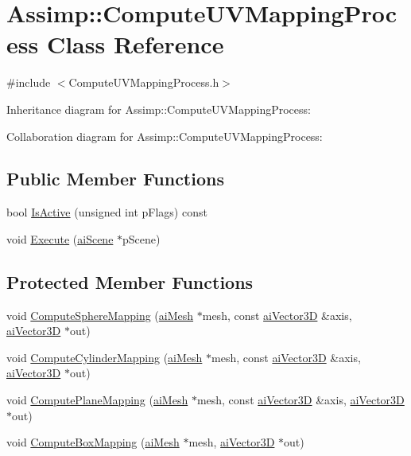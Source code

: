 \hypertarget{class_assimp_1_1_compute_u_v_mapping_process}{\section{Assimp\+:\+:Compute\+U\+V\+Mapping\+Process Class Reference}
\label{class_assimp_1_1_compute_u_v_mapping_process}
}


{\ttfamily \#include $<$Compute\+U\+V\+Mapping\+Process.\+h$>$}



Inheritance diagram for Assimp\+:\+:Compute\+U\+V\+Mapping\+Process\+:


Collaboration diagram for Assimp\+:\+:Compute\+U\+V\+Mapping\+Process\+:
\subsection*{Public Member Functions}
\begin{DoxyCompactItemize}
\item 
bool \hyperlink{class_assimp_1_1_compute_u_v_mapping_process_a4367886b8af45c9cbc91162356bd9450}{Is\+Active} (unsigned int p\+Flags) const 
\item 
void \hyperlink{class_assimp_1_1_compute_u_v_mapping_process_a32b0f8c659ee1decabf1e7c11ce78842}{Execute} (\hyperlink{structai_scene}{ai\+Scene} $\ast$p\+Scene)
\end{DoxyCompactItemize}
\subsection*{Protected Member Functions}
\begin{DoxyCompactItemize}
\item 
void \hyperlink{class_assimp_1_1_compute_u_v_mapping_process_a47e200ae23ec415306a60e4788851454}{Compute\+Sphere\+Mapping} (\hyperlink{structai_mesh}{ai\+Mesh} $\ast$mesh, const \hyperlink{structai_vector3_d}{ai\+Vector3\+D} \&axis, \hyperlink{structai_vector3_d}{ai\+Vector3\+D} $\ast$out)
\item 
void \hyperlink{class_assimp_1_1_compute_u_v_mapping_process_a2d862172069b832a32f3e1c39dfb1940}{Compute\+Cylinder\+Mapping} (\hyperlink{structai_mesh}{ai\+Mesh} $\ast$mesh, const \hyperlink{structai_vector3_d}{ai\+Vector3\+D} \&axis, \hyperlink{structai_vector3_d}{ai\+Vector3\+D} $\ast$out)
\item 
void \hyperlink{class_assimp_1_1_compute_u_v_mapping_process_a3070e62592beab8e44037c65eb2904cc}{Compute\+Plane\+Mapping} (\hyperlink{structai_mesh}{ai\+Mesh} $\ast$mesh, const \hyperlink{structai_vector3_d}{ai\+Vector3\+D} \&axis, \hyperlink{structai_vector3_d}{ai\+Vector3\+D} $\ast$out)
\item 
void \hyperlink{class_assimp_1_1_compute_u_v_mapping_process_a7c5c394afea2047b2fffd5ca20c7209b}{Compute\+Box\+Mapping} (\hyperlink{structai_mesh}{ai\+Mesh} $\ast$mesh, \hyperlink{structai_vector3_d}{ai\+Vector3\+D} $\ast$out)
\end{DoxyCompactItemize}

